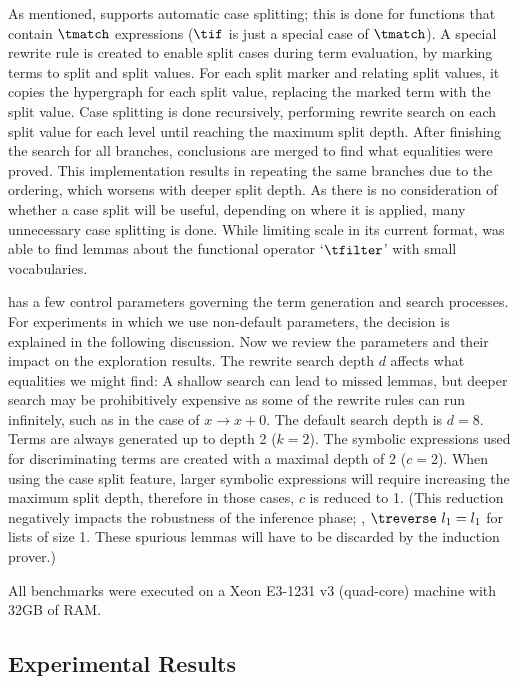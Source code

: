 As mentioned, \TheSy supports automatic case splitting; this is done for functions that contain $\tmatch$ expressions ($\tif$ is just a special case of $\tmatch$). 
A special rewrite rule is created to enable split cases during term evaluation, by marking terms to split and split values. 
For each split marker and relating split values, it copies the hypergraph for each split value, replacing the marked term with the split value. 
Case splitting is done recursively, performing rewrite search on each split value for each level until reaching the maximum split depth. 
After finishing the search for all branches, conclusions are merged to find what equalities were proved.
This implementation results in repeating the same branches due to the ordering, which worsens with deeper split depth. 
As there is no consideration of whether a case split will be useful, depending on where it is applied, many unnecessary case splitting is done.
While limiting scale in its current format, \TheSy was able to find lemmas about the functional operator `$\tfilter$' with small vocabularies.

\TheSy has a few control parameters governing the term generation and search processes.
For experiments in which we use non-default parameters, the decision is explained in the following discussion.
Now we review the parameters and their impact on the exploration results.
The rewrite search depth $d$ affects what equalities we might find: A shallow search can lead to missed lemmas,
but deeper search may be prohibitively expensive as some of the rewrite rules can run infinitely, such as in the case of $x \rightarrow x + 0$.
The default search depth is $d = 8$. 
Terms are always generated up to depth 2 ($k = 2$).
The symbolic expressions used for discriminating terms are created with a maximal depth of 2 ($c = 2$).
When using the case split feature, larger symbolic expressions will require increasing the maximum split depth, therefore in those cases, $c$ is reduced to 1.
(This reduction negatively impacts the robustness of the inference phase; \eg, $\treverse~l_1=l_1$ for lists of size 1. These spurious lemmas will have to be discarded by the induction prover.)

All benchmarks were executed on a Xeon E3-1231 v3 (quad-core) machine with 32GB of RAM.

\subsection{Experimental Results}
\label{results:experimental}

